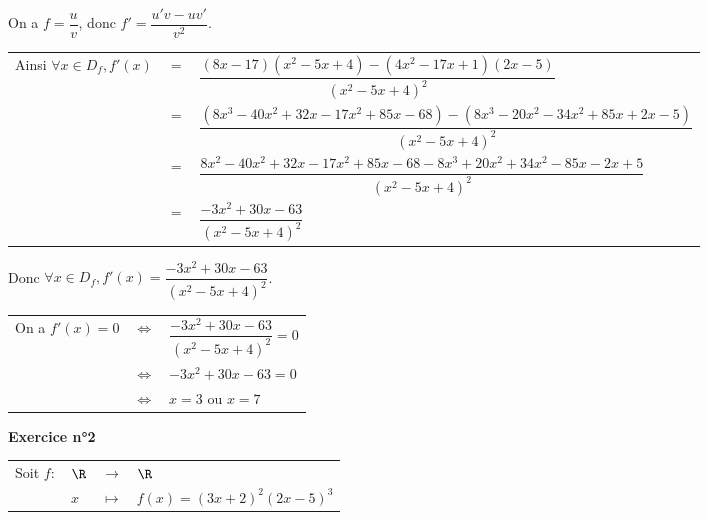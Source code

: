 On a $f = \dfrac{u}{v}$, donc $f' = \dfrac{u'v - uv'}{v^2}$. \vspace*{.3cm} \\

\begin{tabular}{lll}
\hspace*{-.3cm} Ainsi $\forall x \in D_f, f'(x)$ & $=$ & $\dfrac{\left(8x-17\right)\left(x^2-5x+4\right) - \left(4x^2-17x+1\right)\left(2x-5\right)}{\left(x^2-5x+4\right)^2}$ \vspace*{.3cm} \\
& $=$ & $\dfrac{\left(8x^3 - 40x^2 + 32x - 17x^2 + 85x - 68\right) - \left(8x^3 - 20x^2 - 34x^2 + 85x + 2x - 5\right)}{\left(x^2-5x+4\right)^2}$ \vspace*{.3cm} \\
& $=$ & $\dfrac{8x^2 - 40x^2 + 32x - 17x^2 + 85x - 68 - 8x^3 + 20x^2 + 34x^2 - 85x - 2x + 5}{\left(x^2 - 5x + 4\right)^2}$ \vspace*{.3cm} \\
& $=$ & $\dfrac{-3x^2 + 30x - 63}{\left(x^2 - 5x + 4\right)^2}$ \\
\end{tabular}

\vspace*{.3cm}

Donc $\forall x \in D_f, f'(x) = \dfrac{-3x^2 + 30x - 63}{\left(x^2 - 5x + 4\right)^2}$. \vspace*{.3cm} \\

\begin{tabular}{lll}
\hspace*{-.3cm} On a $f'(x) = 0$ & $\Longleftrightarrow$ & $\dfrac{-3x^2 + 30x - 63}{\left(x^2 - 5x + 4\right)^2} = 0$ \vspace*{.3cm} \\
& $\Longleftrightarrow$ & $-3x^2 + 30x - 63 = 0$ \vspace*{.3cm} \\
& $\Longleftrightarrow$ & $x=3$ ou $x=7$ \\
\end{tabular}

\vspace*{-5cm}

\newpage

\textbf{Exercice n°2} \\

\begin{tabular}{llll}
\hspace{-.3cm} Soit $f:$ & $\R$ & $\longrightarrow$ & $\R$ \\
& $x$ & $\longmapsto$ & $f(x) = \left(3x+2\right)^2\left(2x-5\right)^3$ \\
\end{tabular}

